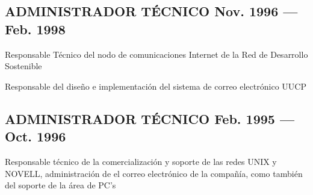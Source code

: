 \documentclass[letter,10pt]{article}
\begin{document}
\subsection{{ADMINISTRADOR TÉCNICO \hfill Nov. 1996 --- Feb. 1998}}
\begin{zitemize}
\item Responsable Técnico del nodo de comunicaciones Internet de la Red de Desarrollo Sostenible
\item Responsable del diseño e implementación del sistema de correo electrónico UUCP
\end{zitemize}
\vspace*{2mm}
\subsection{{ADMINISTRADOR TÉCNICO \hfill Feb. 1995 --- Oct. 1996}}
\begin{zitemize}
	\item	Responsable técnico de la comercialización y soporte de las redes UNIX y NOVELL, administración de el correo electrónico de la compañía, como también del soporte de la área de PC's
\end{zitemize}
\end{document}
